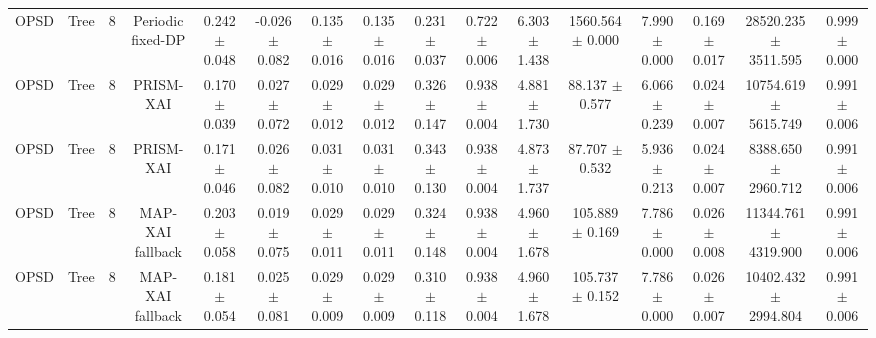 \begin{tabular}{lccccccccccccccc}
OPSD & Tree & 8 & Periodic fixed-DP & 0.242 $\pm$ 0.048 & -0.026 $\pm$ 0.082 & 0.135 $\pm$ 0.016 & 0.135 $\pm$ 0.016 & 0.231 $\pm$ 0.037 & 0.722 $\pm$ 0.006 & 6.303 $\pm$ 1.438 & 1560.564 $\pm$ 0.000 & 7.990 $\pm$ 0.000 & 0.169 $\pm$ 0.017 & 28520.235 $\pm$ 3511.595 & 0.999 $\pm$ 0.000 \\
OPSD & Tree & 8 & PRISM-XAI & 0.170 $\pm$ 0.039 & 0.027 $\pm$ 0.072 & 0.029 $\pm$ 0.012 & 0.029 $\pm$ 0.012 & 0.326 $\pm$ 0.147 & 0.938 $\pm$ 0.004 & 4.881 $\pm$ 1.730 & 88.137 $\pm$ 0.577 & 6.066 $\pm$ 0.239 & 0.024 $\pm$ 0.007 & 10754.619 $\pm$ 5615.749 & 0.991 $\pm$ 0.006 \\
OPSD & Tree & 8 & PRISM-XAI & 0.171 $\pm$ 0.046 & 0.026 $\pm$ 0.082 & 0.031 $\pm$ 0.010 & 0.031 $\pm$ 0.010 & 0.343 $\pm$ 0.130 & 0.938 $\pm$ 0.004 & 4.873 $\pm$ 1.737 & 87.707 $\pm$ 0.532 & 5.936 $\pm$ 0.213 & 0.024 $\pm$ 0.007 & 8388.650 $\pm$ 2960.712 & 0.991 $\pm$ 0.006 \\
OPSD & Tree & 8 & MAP-XAI fallback & 0.203 $\pm$ 0.058 & 0.019 $\pm$ 0.075 & 0.029 $\pm$ 0.011 & 0.029 $\pm$ 0.011 & 0.324 $\pm$ 0.148 & 0.938 $\pm$ 0.004 & 4.960 $\pm$ 1.678 & 105.889 $\pm$ 0.169 & 7.786 $\pm$ 0.000 & 0.026 $\pm$ 0.008 & 11344.761 $\pm$ 4319.900 & 0.991 $\pm$ 0.006 \\
OPSD & Tree & 8 & MAP-XAI fallback & 0.181 $\pm$ 0.054 & 0.025 $\pm$ 0.081 & 0.029 $\pm$ 0.009 & 0.029 $\pm$ 0.009 & 0.310 $\pm$ 0.118 & 0.938 $\pm$ 0.004 & 4.960 $\pm$ 1.678 & 105.737 $\pm$ 0.152 & 7.786 $\pm$ 0.000 & 0.026 $\pm$ 0.007 & 10402.432 $\pm$ 2994.804 & 0.991 $\pm$ 0.006 \\
\bottomrule
\end{tabular}
